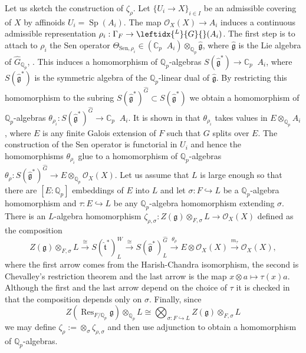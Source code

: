 \documentclass{amsart}
\theoremstyle{definition}
\theoremstyle{remark}
\DeclareMathOperator{\Res}{Res}
\DeclareMathOperator{\Sp}{Sp}
\newcommand{\Qp}{\mathbb {Q}_p}
\newcommand{\OO}{\mathcal O}
\DeclareMathOperator{\wtimes}{\widehat{\otimes}}
\newcommand{\Cp}{\mathbb C_p}
\newcommand{\Ghat}{\widehat{G}}
\newcommand{\LG}{\leftidx{^L}{G}{}}
\newcommand{\ghat}{\widehat{\mathfrak g}}
\newcommand{\that}{\widehat{\mathfrak t}}
\newcommand{\Sen}{\mathrm{Sen}}
\begin{document}
Let us sketch the construction of $\zeta_{\rho}$. Let $\{U_i\rightarrow X\}_{i\in I}$
be an admissible covering of $X$ by affinoids $U_i=\Sp(A_i)$. 
The map $\OO_X(X)\rightarrow A_i$ induces a continuous admissible 
representation $\rho_i: \Gamma_F \rightarrow \LG(A_i)$. 
 The first step 
is to attach to $\rho_i$ the Sen operator $\Theta_{\Sen, \rho_i}\in (\Cp \wtimes A_i)\otimes_{\Qp} \ghat$, where $\ghat$ 
is the Lie algebra of $\Ghat_{\Qp}$, \cite[Lemma 4.6]{DPS}.  This induces a homomorphism of $\Qp$-algebras $S(\ghat^*)\rightarrow \Cp \wtimes A_i$, 
where $S(\ghat^*)$ is the symmetric algebra of the 
$\Qp$-linear dual of $\ghat$. By restricting this homomorphism to the subring $S(\ghat^*)^{\Ghat}\subset S(\ghat^*)$ we obtain 
a homomorphism of $\Qp$-algebras 
$\theta_{\rho_i}: S(\ghat^*)^{\Ghat} \rightarrow \Cp\wtimes A_i$.
It is shown in \cite[Lemma 4.10]{DPS} that  $\theta_{\rho_i}$ takes values in $E\otimes_{\Qp} A_i$, where $E$ is any finite 
Galois extension of $F$ such that $G$ splits over $E$. 
The construction of the Sen operator is functorial in $U_i$ and 
hence the homomorphisms  $\theta_{\rho_i}$ glue to a homomorphism 
of $\Qp$-algebras $\theta_{\rho}: S(\ghat^*)^{\Ghat} \rightarrow E \otimes_{\Qp} \OO_X(X)$. Let us assume that $L$ is large enough 
so that there are $[E:\Qp]$ embeddings of $E$ into $L$ and let
$\sigma: F\hookrightarrow L$ be a $\Qp$-algebra homomorphism 
and $\tau: E \hookrightarrow L$ be any  $\Qp$-algebra homomorphism 
extending $\sigma$. There is an $L$-algebra homomorphism 
$\zeta_{\rho, \sigma}: Z(\mathfrak g)\otimes_{F, \sigma} L \rightarrow \OO_X(X)$ defined as the composition
\begin{equation}\label{one}
Z(\mathfrak g)\otimes_{F, \sigma} L \overset{\cong}{\longrightarrow} S(\that^*)^W_L\overset{\cong}{\longrightarrow}S(\ghat^*)^{\Ghat}_L
               \overset{\theta_{\rho}}{\longrightarrow} E\otimes \OO_X(X)
\overset{m_{\tau}}{\longrightarrow} \OO_X(X),
\end{equation}
where the first arrow comes from the Harish-Chandra isomorphism, the 
second is Chevalley's restriction theorem and the last arrow is the map $x\otimes a\mapsto \tau(x)a$. Although the first and the last 
arrow depend on the choice of $\tau$ it is checked in \cite[Lemma 4.18]{DPS} that the composition depends only on $\sigma$. 
Finally, since 
$$Z(\Res_{F/\Qp}\mathfrak g)\otimes_{\Qp} L \cong \bigotimes_{\sigma: F \hookrightarrow L} Z(\mathfrak g)\otimes_{F, \sigma} L$$
we may define $\zeta_{\rho}:= \otimes_{\sigma} \zeta_{\rho, \sigma}$ and then use 
adjunction to obtain a 
homomorphism of $\Qp$-algebras. 
\end{document}
